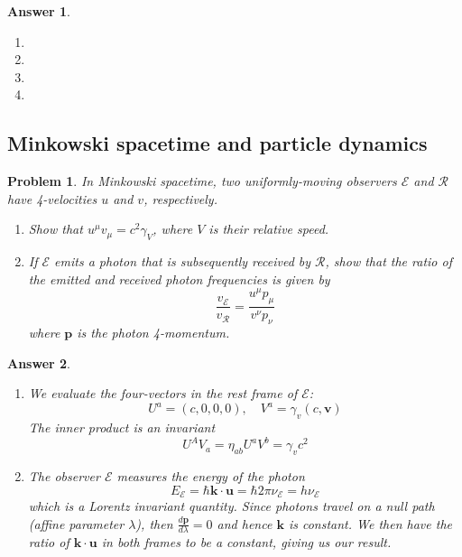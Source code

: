 \documentclass[a4paper]{article}
\newtheorem{ans}{Answer}[subsection]
\theoremstyle{new}
\newtheorem{qns}{Problem}[section]
\begin{document}
\newpage
\begin{ans}\leavevmode
\begin{enumerate}[label=(\alph*)]
\item

\item 

\item 

\item 
\end{enumerate}
\end{ans}

\newpage
\subsection*{Minkowski spacetime and particle dynamics}
\begin{qns}
In Minkowski spacetime, two uniformly-moving observers $\mathcal{E}$ and $\mathcal{R}$ have 4-velocities $u$ and $v$, respectively.
\begin{enumerate}[label=(\alph*)]
\item  Show that $u^\mu v_\mu=c^2\gamma_V$, where $V$ is their relative speed.
\item  If $\mathcal{E}$ emits a photon that is subsequently received by $\mathcal{R}$, show that the ratio of the emitted and received photon frequencies is given by
$$\frac{v_{\mathcal{E}}}{v_{\mathcal{R}}}=\frac{u^\mu p_\mu}{v^\nu p_\nu}$$
where $\mathbf{p}$ is the photon 4-momentum.
\end{enumerate}
\end{qns}
\begin{ans}\leavevmode
\begin{enumerate}[label=(\alph*)]
\item We evaluate the four-vectors in the rest frame of $\mathcal{E}$:
$$U^a=(c,0,0,0),\quad V^a=\gamma_v(c,\mathbf{v})$$
The inner product is an invariant
$$U^AV_a=\eta_{ab}U^aV^b=\gamma_vc^2$$
\item The observer $\mathcal{E}$ measures the energy of the photon
$$E_\mathcal{E}=\hbar\mathbf{k}\cdot\mathbf{u}=\hbar 2\pi\nu_\mathcal{E}=h\nu_{\mathcal{E}}$$
which is a Lorentz invariant quantity. Since photons travel on a null path (affine parameter $\lambda$), then $\frac{d\mathbf{p}}{d\lambda}=0$ and hence $\mathbf{k}$ is constant. We then have the ratio of $\mathbf{k}\cdot\mathbf{u}$ in both frames to be a constant, giving us our result.
\end{enumerate}
\end{ans}
\end{document}
